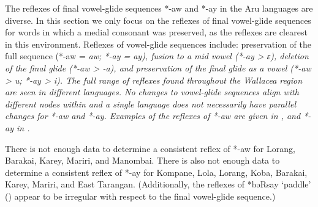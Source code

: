 The reflexes of final vowel-glide sequences *-aw
and *-ay in the Aru languages are diverse.
 In this section we only focus on the reflexes of final vowel-glide
sequences for words in which a medial consonant was preserved,
as the reflexes are clearest in this environment.
Reflexes of vowel-glide sequences include: preservation of the
full sequence (*-aw = \it{aw;} *-ay = \it{ay}),
fusion to a mid vowel (*-ay > \it{ɛ}),
deletion of the final glide (*-aw \it{>} -\it{a}),
and preservation of the final glide as a vowel (*-aw > \it{u}; *-ay > \it{i}).
The full range of reflexes found throughout the Wallacea region
are seen in different  languages.
No changes to vowel-glide sequences align with different nodes
within  and a single language does not necessarily have parallel changes
for *-aw and *-ay.
Examples of the reflexes of *-aw are given in ,
and *-ay in .

There is not enough data to determine a consistent reflex of
*-aw for Lorang, Barakai, Karey, Mariri, and Manombai.
There is also not enough data to determine a consistent reflex
of *-ay for Kompane,
Lola, Lorang, Koba, Barakai,
Karey, Mariri, and East Tarangan.
(Additionally, the reflexes of *bəRsay ‘paddle’ ()
appear to be irregular with respect to the final vowel-glide
sequence.) 

